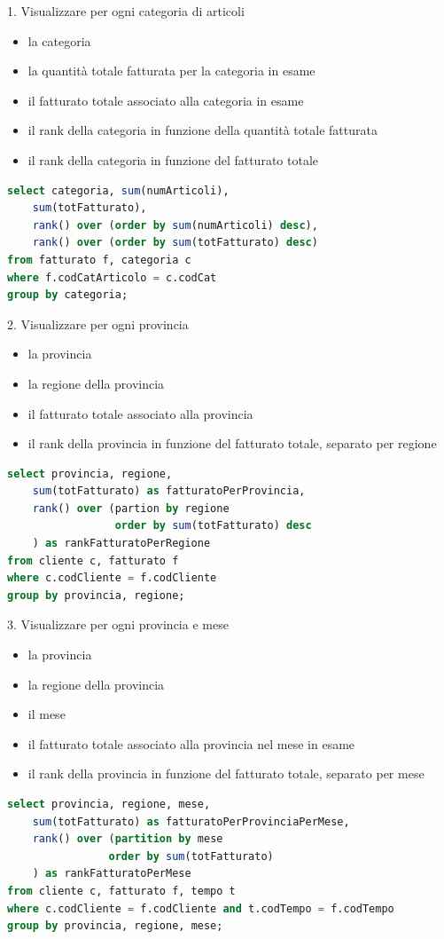 \documentclass[12pt]{article}
\begin{document}
1. Visualizzare per ogni categoria di articoli
\begin{itemize}
    \item la categoria
    \item la quantità totale fatturata per la categoria in esame
    \item il fatturato totale associato alla categoria in esame
    \item il rank della categoria in funzione della quantità totale fatturata
    \item il rank della categoria in funzione del fatturato totale
\end{itemize}
\begin{lstlisting}[language=sql]
select categoria, sum(numArticoli),
    sum(totFatturato),
    rank() over (order by sum(numArticoli) desc),
    rank() over (order by sum(totFatturato) desc)
from fatturato f, categoria c
where f.codCatArticolo = c.codCat
group by categoria;
\end{lstlisting}
2. Visualizzare per ogni provincia
\begin{itemize}
    \item la provincia
    \item la regione della provincia
    \item il fatturato totale associato alla provincia
    \item il rank della provincia in funzione del fatturato totale, separato per regione
\end{itemize}
\begin{lstlisting}[language=sql]
select provincia, regione,
    sum(totFatturato) as fatturatoPerProvincia,
    rank() over (partion by regione
                 order by sum(totFatturato) desc
    ) as rankFatturatoPerRegione
from cliente c, fatturato f
where c.codCliente = f.codCliente
group by provincia, regione;
\end{lstlisting}
3. Visualizzare per ogni provincia e mese
\begin{itemize}
    \item la provincia
    \item la regione della provincia
    \item il mese
    \item il fatturato totale associato alla provincia nel mese in esame
    \item il rank della provincia in funzione del fatturato totale, separato per mese
\end{itemize}
\begin{lstlisting}[language=sql]
select provincia, regione, mese,
    sum(totFatturato) as fatturatoPerProvinciaPerMese,
    rank() over (partition by mese
                order by sum(totFatturato)
    ) as rankFatturatoPerMese
from cliente c, fatturato f, tempo t
where c.codCliente = f.codCliente and t.codTempo = f.codTempo
group by provincia, regione, mese;
\end{lstlisting}
\end{document}
